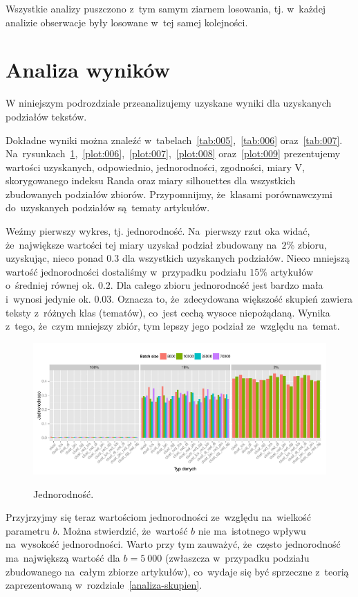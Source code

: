 \documentclass{praca1}
\begin{document}
Wszystkie analizy puszczono z~tym samym ziarnem losowania, tj. w~każdej analizie obserwacje były losowane w~tej samej kolejności. 

\section{Analiza wyników}


W niniejszym podrozdziale przeanalizujemy uzyskane wyniki dla uzyskanych podziałów tekstów.

Dokładne wyniki można znaleźć w~tabelach~\ref{tab:005},~\ref{tab:006} oraz~\ref{tab:007}. Na~rysunkach~\ref{plot:005},~\ref{plot:006},~\ref{plot:007},~\ref{plot:008} oraz~\ref{plot:009} prezentujemy wartości uzyskanych, odpowiednio, jednorodności, zgodności, miary V, skorygowanego indeksu Randa oraz miary silhouettes dla wszystkich zbudowanych podziałów zbiorów. Przypomnijmy, że~klasami porównawczymi do~uzyskanych podziałów są~tematy artykułów.

Weźmy pierwszy wykres, tj. jednorodność. Na~pierwszy rzut oka widać, że~największe wartości tej miary uzyskał podział zbudowany na~$2\%$ zbioru, uzyskując, nieco ponad $0.3$ dla wszystkich uzyskanych podziałów. Nieco mniejszą wartość jednorodności dostaliśmy w~przypadku podziału $15\%$ artykułów o~średniej równej ok. $0.2$. Dla całego zbioru jednorodność jest bardzo mała i~wynosi jedynie ok. $0.03$. Oznacza to, że~zdecydowana większość skupień zawiera teksty z~różnych klas (tematów), co~jest cechą wysoce niepożądaną. Wynika z~tego, że~czym mniejszy zbiór, tym lepszy jego podział ze~względu na~temat.

\begin{figure}[!h]
  \centering
  \includegraphics[width=400pt]{plot10.pdf}\\
  \caption{Jednorodność.}\label{plot:005}
\end{figure}

Przyjrzyjmy się teraz wartościom jednorodności ze~względu na~wielkość parametru $b$. Można stwierdzić, że~wartość $b$ nie ma~istotnego wpływu na~wysokość jednorodności. Warto przy tym zauważyć, że~często jednorodność ma~największą wartość dla $b=5\ 000$ (zwłaszcza w~przypadku podziału zbudowanego na~całym zbiorze artykułów), co~wydaje się być sprzeczne z~teorią zaprezentowaną w~rozdziale~\ref{analiza-skupien}.
\end{document}
